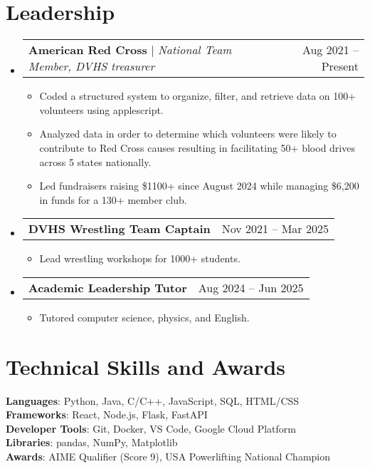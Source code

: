\documentclass[letterpaper,11pt]{article}
\makeatletter
\newcommand{\resumeItem}[1]{
  \item\small{
    {#1 \vspace{-2pt}}
  }
}
\newcommand{\resumeProjectHeading}[2]{
    \item
    \begin{tabular*}{0.97\textwidth}{l@{\extracolsep{\fill}}r}
      \small#1 & #2 \\
    \end{tabular*}\vspace{-7pt}
}
\newcommand{\resumeSubHeadingListStart}{\begin{itemize}[leftmargin=0.15in, label={}]}
\newcommand{\resumeSubHeadingListEnd}{\end{itemize}}
\newcommand{\resumeItemListStart}{\begin{itemize}}
\newcommand{\resumeItemListEnd}{\end{itemize}\vspace{-5pt}}
\makeatother
\begin{document}
\section{Leadership}
    \resumeSubHeadingListStart
      \resumeProjectHeading
          {\textbf{American Red Cross} $|$ \emph{National Team Member, DVHS treasurer}}{Aug 2021 -- Present}
          \resumeItemListStart
            \resumeItem{Coded a structured system to organize, filter, and retrieve data on 100+ volunteers using applescript.}
            \resumeItem{Analyzed data in order to determine which volunteers were likely to contribute to Red Cross causes resulting in facilitating 50+ blood drives across 5 states nationally.}
            \resumeItem{Led fundraisers raising \$1100+ since August 2024 while managing \$6,200 in funds for a 130+ member club.}
          \resumeItemListEnd
      \resumeProjectHeading
          {\textbf{DVHS Wrestling Team Captain}}{Nov 2021 -- Mar 2025}
          \resumeItemListStart
            \resumeItem{Lead wrestling workshops for 1000+ students.}
          \resumeItemListEnd
      \resumeProjectHeading
          {\textbf{Academic Leadership Tutor}}{Aug 2024 -- Jun 2025}
          \resumeItemListStart
            \resumeItem{Tutored computer science, physics, and English.}
          \resumeItemListEnd
    \resumeSubHeadingListEnd

\section{Technical Skills and Awards}
 \begin{itemize}[leftmargin=0.15in, label={}]
    \small{\item{
     \textbf{Languages}{: Python, Java, C/C++, JavaScript, SQL, HTML/CSS} \\
     \textbf{Frameworks}{: React, Node.js, Flask, FastAPI} \\
     \textbf{Developer Tools}{: Git, Docker, VS Code, Google Cloud Platform} \\
     \textbf{Libraries}{: pandas, NumPy, Matplotlib} \\
     \textbf{Awards}{: AIME Qualifier (Score 9), USA Powerlifting National Champion}
    }}
 \end{itemize}

\end{document}
